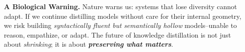 \vspace{0.5em}
\noindent \textbf{A Biological Warning.} Nature warns us: systems that lose diversity cannot adapt. If we continue distilling models without care for their internal geometry, we risk building \emph{syntactically fluent but semantically hollow} models--unable to reason, empathize, or adapt. The future of knowledge distillation is not just about \emph{shrinking}; it is about \textbf{\emph{preserving what matters}}.


